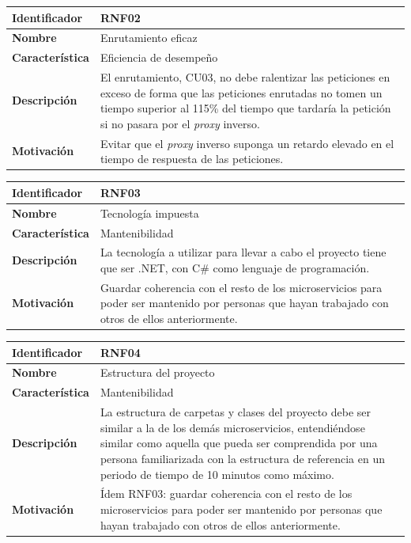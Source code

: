 \documentclass[11pt,spanish,listoffigures]{tfgetsinf}
\begin{document}
\begin{center} \begin{tabular}{| l | p{11.3cm} |}
\hline
\textbf{Identificador} & RNF02
\\ \hline
\textbf{Nombre} & Enrutamiento eficaz
\\ \hline
\textbf{Característica} & Eficiencia de desempeño
\\ \hline
\textbf{Descripción} & El enrutamiento, CU03, no debe ralentizar las peticiones en exceso de forma que las peticiones enrutadas no tomen un tiempo superior al 115\% del tiempo que tardaría la petición si no pasara por el \emph{proxy} inverso.
\\ \hline
\textbf{Motivación} & Evitar que el \emph{proxy} inverso suponga un retardo elevado en el tiempo de respuesta de las peticiones.
\\ \hline \end{tabular} \end{center}

\begin{center} \begin{tabular}{| l | p{11.3cm} |}
\hline
\textbf{Identificador} & RNF03
\\ \hline
\textbf{Nombre} & Tecnología impuesta
\\ \hline
\textbf{Característica} & Mantenibilidad
\\ \hline
\textbf{Descripción} & La tecnología a utilizar para llevar a cabo el proyecto tiene que ser .NET, con C\# como lenguaje de programación.
\\ \hline
\textbf{Motivación} & Guardar coherencia con el resto de los microservicios para poder ser mantenido por personas que hayan trabajado con otros de ellos anteriormente.
\\ \hline \end{tabular} \end{center}

\begin{center} \begin{tabular}{| l | p{11.3cm} |}
\hline
\textbf{Identificador} & RNF04
\\ \hline
\textbf{Nombre} & Estructura del proyecto
\\ \hline
\textbf{Característica} & Mantenibilidad
\\ \hline
\textbf{Descripción} & La estructura de carpetas y clases del proyecto debe ser similar a la de los demás microservicios, entendiéndose similar como aquella que pueda ser comprendida por una persona familiarizada con la estructura de referencia en un periodo de tiempo de 10 minutos como máximo.
\\ \hline
\textbf{Motivación} & Ídem RNF03: guardar coherencia con el resto de los microservicios para poder ser mantenido por personas que hayan trabajado con otros de ellos anteriormente.
\\ \hline \end{tabular} \end{center}
\end{document}
